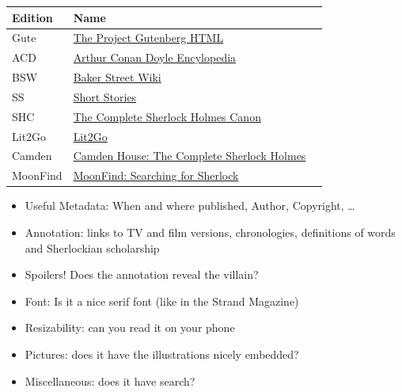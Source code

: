 \documentclass[a4paper,landscape,headrule,footrule,xetex]{foils}
\begin{document}
\begin{tabular}{lll}
Edition & Name  \\ %
\hline
Gute      & 
\href{https://www.gutenberg.org/files/1661/1661-h/1661-h.htm#8}{The
           Project Gutenberg HTML} \\
ACD     & 
\href{https://www.arthur-conan-doyle.com/index.php?title=SPEC}{Arthur Conan Doyle Encylopedia}\\
BSW      & 
\href{http://bakerstreet.wikia.com/wiki/The_Adventure_of_the_Speckled_Band}{Baker Street Wiki}\\
SS       & \href{http://www.eastoftheweb.com/short-stories/UBooks/AdveSpec.shtml}{Short Stories}\\
SHC      & \href{https://sherlock-holm.es/stories/html/spec.html}{The Complete Sherlock Holmes Canon}\\
Lit2Go   & \href{http://etc.usf.edu/lit2go/32/the-adventures-of-sherlock-holmes/352/adventure-8-the-adventure-of-the-speckled-band/}{Lit2Go}\\
Camden   &
           \href{http://ignisart.com/camdenhouse/canon/index.htm}{Camden House: The Complete Sherlock Holmes} \\
MoonFind & \href{http://mrmoon.com/moonfind/holmes/}{MoonFind: Searching for Sherlock}
\end{tabular}



\begin{itemize}
\item Useful Metadata: When and where published, Author, Copyright,
  \ldots
\item Annotation:  links to TV and film
versions, chronologies, definitions of words and Sherlockian
scholarship
\item Spoilers!  Does the annotation reveal the villain?
\item Font: Is it a nice serif font (like in the Strand Magazine)
\item Resizability: can you read it on your phone
\item Pictures: does it have the illustrations nicely embedded?
\item Miscellaneous:  does it have search?

\end{itemize}


\end{document}
